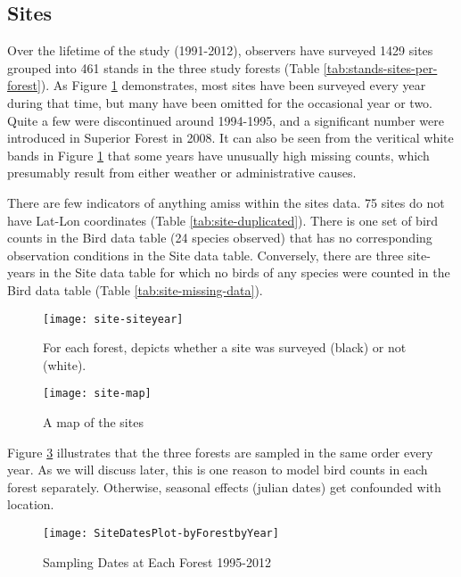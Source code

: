 \subsection{Sites}

Over the lifetime of the study (1991-2012), observers have surveyed 1429 sites grouped into 461 stands in the three study forests (Table \ref{tab:stands-sites-per-forest}).  As Figure \ref{fig:site-siteyear} demonstrates, most sites have been surveyed every year during that time, but many have been omitted for the occasional year or two.  Quite a few were discontinued around 1994-1995, and a significant number were introduced in Superior Forest in 2008.  It can also be seen from the veritical white bands in Figure \ref{fig:site-siteyear} that some years have unusually high missing counts, which presumably result from either weather or administrative causes.\par
There are few indicators of anything amiss within the sites data.  75 sites do not have Lat-Lon coordinates (Table \ref{tab:site-duplicated}).  There is one set of bird counts in the Bird data table (24 species observed) that has no corresponding observation conditions in the Site data table.  Conversely, there are three site-years in the Site data table for which no birds of any species were counted in the Bird data table (Table \ref{tab:site-missing-data}).

\begin{figure}
\texttt{[image: site-siteyear]}
\caption{For each forest, depicts whether a site was surveyed (black) or not (white).}
\label{fig:site-siteyear}
\end{figure}







\begin{figure}
\texttt{[image: site-map]}
\caption{A map of the sites}
\label{fig:site-map}
\end{figure}

Figure \ref{fig:SiteDatesPlot-byForestbyYear} illustrates that the three forests are sampled in the same order every year.  As we will discuss later, this is one reason to model bird counts in each forest separately.  Otherwise, seasonal effects (julian dates) get confounded with location.

\begin{figure}
\texttt{[image: SiteDatesPlot-byForestbyYear]}
\caption{Sampling Dates at Each Forest 1995-2012}
\label{fig:SiteDatesPlot-byForestbyYear}
\end{figure}

